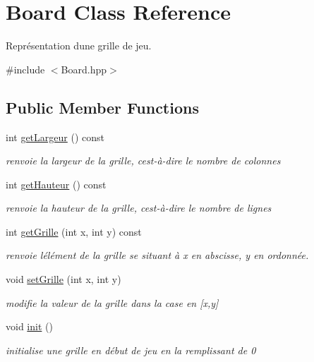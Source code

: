 \hypertarget{classBoard}{}\section{Board Class Reference}
\label{classBoard}


Représentation d\textquotesingle{}une grille de jeu.  




{\ttfamily \#include $<$Board.\+hpp$>$}

\subsection*{Public Member Functions}
\begin{DoxyCompactItemize}
\item 
\mbox{\label{classBoard_ac7cfff6987702708f85280af70e6c7b4}} 
int \hyperlink{classBoard_ac7cfff6987702708f85280af70e6c7b4}{get\+Largeur} () const
\begin{DoxyCompactList}\small\item\em renvoie la largeur de la grille, c\textquotesingle{}est-\/à-\/dire le nombre de colonnes \end{DoxyCompactList}\item 
\mbox{\label{classBoard_af69f2b14974e2c6b7fcffa3fef58340f}} 
int \hyperlink{classBoard_af69f2b14974e2c6b7fcffa3fef58340f}{get\+Hauteur} () const
\begin{DoxyCompactList}\small\item\em renvoie la hauteur de la grille, c\textquotesingle{}est-\/à-\/dire le nombre de lignes \end{DoxyCompactList}\item 
\mbox{\label{classBoard_aea48e2901225f0fae6af38096fb16ef8}} 
int \hyperlink{classBoard_aea48e2901225f0fae6af38096fb16ef8}{get\+Grille} (int x, int y) const
\begin{DoxyCompactList}\small\item\em renvoie l\textquotesingle{}élément de la grille se situant à x en abscisse, y en ordonnée. \end{DoxyCompactList}\item 
\mbox{\label{classBoard_a7c06f0c081a6a037fa65204a7a9badd2}} 
void \hyperlink{classBoard_a7c06f0c081a6a037fa65204a7a9badd2}{set\+Grille} (int x, int y)
\begin{DoxyCompactList}\small\item\em modifie la valeur de la grille dans la case en \mbox{[}x,y\mbox{]} \end{DoxyCompactList}\item 
\mbox{\label{classBoard_a2cf5d799795f86a50d5d6eb4bd353b93}} 
void \hyperlink{classBoard_a2cf5d799795f86a50d5d6eb4bd353b93}{init} ()
\begin{DoxyCompactList}\small\item\em initialise une grille en début de jeu en la remplissant de 0 \end{DoxyCompactList}\end{DoxyCompactItemize}
